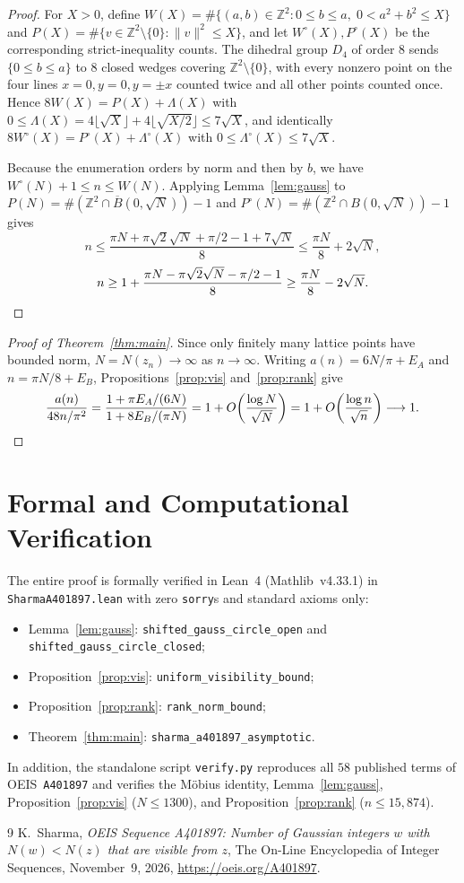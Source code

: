 \documentclass[11pt]{article}
\begin{document}
\begin{proof}
For $X > 0$, define $W(X) = \#\{(a,b) \in \mathbb{Z}^2 : 0 \le b \le a,\; 0 < a^2 + b^2 \le X\}$
and $P(X) = \#\{v \in \mathbb{Z}^2 \setminus \{0\} : \|v\|^2 \le X\}$, and let
$W^\circ(X), P^\circ(X)$ be the corresponding strict-inequality counts. The
dihedral group $D_4$ of order $8$ sends $\{0 \le b \le a\}$ to $8$ closed wedges
covering $\mathbb{Z}^2 \setminus \{0\}$, with every nonzero point on the four
lines $x = 0, y = 0, y = \pm x$ counted twice and all other points counted once.
Hence $8 W(X) = P(X) + \Lambda(X)$ with
$0 \le \Lambda(X) = 4\lfloor\sqrt{X}\rfloor + 4\lfloor\sqrt{X/2}\rfloor \le 7\sqrt{X}$,
and identically $8 W^\circ(X) = P^\circ(X) + \Lambda^\circ(X)$ with
$0 \le \Lambda^\circ(X) \le 7\sqrt{X}$.

Because the enumeration orders by norm and then by $b$, we have
$W^\circ(N) + 1 \le n \le W(N)$. Applying Lemma~\ref{lem:gauss} to
$P(N) = \#(\mathbb{Z}^2 \cap \overline{B}(0, \sqrt{N})) - 1$ and
$P^\circ(N) = \#(\mathbb{Z}^2 \cap B(0, \sqrt{N})) - 1$ gives
\[
n \le \frac{\pi N + \pi\sqrt{2}\sqrt{N} + \pi/2 - 1 + 7\sqrt{N}}{8} \le \frac{\pi N}{8} + 2\sqrt{N},
\]
\[
n \ge 1 + \frac{\pi N - \pi\sqrt{2}\sqrt{N} - \pi/2 - 1}{8} \ge \frac{\pi N}{8} - 2\sqrt{N}. \qedhere
\]
\end{proof}

\begin{proof}[Proof of Theorem~\ref{thm:main}]
Since only finitely many lattice points have bounded norm, $N = N(z_n) \to \infty$
as $n \to \infty$. Writing $a(n) = 6N/\pi + E_A$ and $n = \pi N/8 + E_B$,
Propositions~\ref{prop:vis} and~\ref{prop:rank} give
\[
\frac{a(n)}{48n/\pi^2} = \frac{1 + \pi E_A / (6N)}{1 + 8 E_B / (\pi N)}
= 1 + O\!\left(\frac{\log N}{\sqrt{N}}\right)
= 1 + O\!\left(\frac{\log n}{\sqrt{n}}\right) \longrightarrow 1. \qedhere
\]
\end{proof}

\section{Formal and Computational Verification}

The entire proof is formally verified in Lean~4 (Mathlib~v4.33.1) in
\texttt{SharmaA401897.lean} with zero \texttt{sorry}s and standard axioms only:
\begin{itemize}
  \item Lemma~\ref{lem:gauss}: \texttt{shifted\_gauss\_circle\_open} and
        \texttt{shifted\_gauss\_circle\_closed};
  \item Proposition~\ref{prop:vis}: \texttt{uniform\_visibility\_bound};
  \item Proposition~\ref{prop:rank}: \texttt{rank\_norm\_bound};
  \item Theorem~\ref{thm:main}: \texttt{sharma\_a401897\_asymptotic}.
\end{itemize}
In addition, the standalone script \texttt{verify.py} reproduces all $58$
published terms of OEIS~\texttt{A401897} and verifies the M\"obius identity,
Lemma~\ref{lem:gauss}, Proposition~\ref{prop:vis} ($N \le 1300$), and
Proposition~\ref{prop:rank} ($n \le 15{,}874$).

\begin{thebibliography}{9}
K.~Sharma,
\emph{OEIS Sequence A401897: Number of Gaussian integers $w$ with $N(w) < N(z)$
that are visible from $z$},
The On-Line Encyclopedia of Integer Sequences, November~9, 2026,
\url{https://oeis.org/A401897}.
\end{thebibliography}
\end{document}
